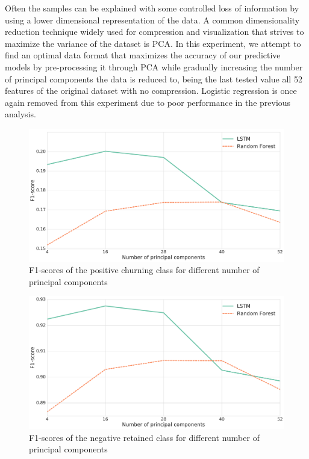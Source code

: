 \documentclass{kththesis}
\begin{document}
Often the samples can be explained with some controlled loss of information by using a lower dimensional representation of the data. A common dimensionality reduction technique widely used for compression and visualization that strives to maximize the variance of the dataset is PCA. In this experiment, we attempt to find an optimal data format that maximizes the accuracy of our predictive models by pre-processing it through PCA while gradually increasing the number of principal components the data is reduced to, being the last tested value all 52 features of the original dataset with no compression. Logistic regression is once again removed from this experiment due to poor performance in the previous analysis.

\begin{figure}
    \centering
    \includegraphics[width=1.0\textwidth,keepaspectratio]{figures/line_dim_reduction.pdf}
    \caption{F1-scores of the positive churning class for different number of principal components}
    \label{fig:line_dim_reduction}
\end{figure}

\begin{figure}
    \centering
    \includegraphics[width=1.0\textwidth,keepaspectratio]{figures/line_dim_reduction_retained.pdf}
    \caption{F1-scores of the negative retained class for different number of principal components}
    \label{fig:line_dim_reduction_ret}
\end{figure}
\end{document}
